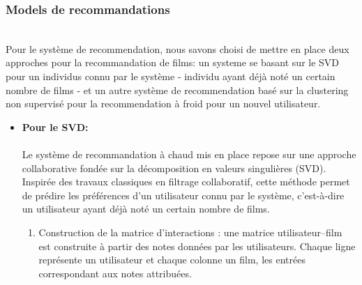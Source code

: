 \documentclass{article}
\begin{document}
\subsubsection{Models de recommandations}
$ $\\
Pour le système de recommendation, nous savons choisi de mettre en place deux approches pour la recommandation de films: un systeme se basant sur le SVD pour un
individus connu par le système - individu ayant déjà noté un certain nombre de films - et un autre système de recommendation basé sur la clustering non supervisé
pour la recommendation à froid pour un nouvel utilisateur.\\
\begin{itemize}
    \item \textbf{Pour le SVD:} \\
          $ $\\
          Le système de recommandation à chaud mis en place repose sur une approche collaborative fondée sur la décomposition en valeurs singulières (SVD).
          Inspirée des travaux classiques en filtrage collaboratif, cette méthode permet de prédire les préférences d’un utilisateur connu par le système, c’est-à-dire un utilisateur ayant déjà noté un certain nombre de films.

          \begin{enumerate}
              \item Construction de la matrice d’interactions : une matrice utilisateur–film est construite à partir des notes données par les utilisateurs.
                    Chaque ligne représente un utilisateur et chaque colonne un film, les entrées correspondant aux notes attribuées.


\end{enumerate}
\end{itemize}
\end{document}
